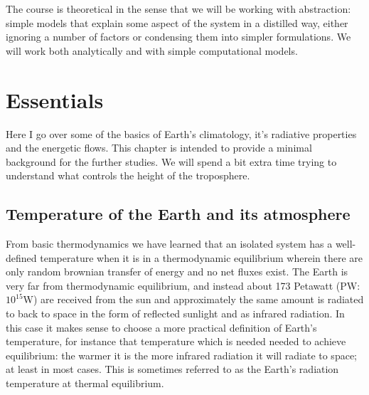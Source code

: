 \documentclass[12pt]{book}
\begin{document}
The course is theoretical in the sense that we will be working with abstraction: simple models that explain some aspect of the system in a distilled way, either ignoring a number of factors or condensing them into simpler formulations. We will work both analytically and with simple computational models. 



\mainmatter
\chapter{Essentials}
\label{chapter:essentials}
Here I go over some of the basics of Earth's climatology, it's radiative properties and the energetic flows. This chapter is intended to provide a minimal background for the further studies. We will spend a bit extra time trying to understand what controls the height of the troposphere. 

\section{Temperature of the Earth and its atmosphere}
From basic thermodynamics we have learned that an isolated system has a well-defined temperature when it is in a thermodynamic equilibrium wherein there are only random brownian transfer of energy and no net fluxes exist. The Earth is very far from thermodynamic equilibrium, and instead about 173 Petawatt (PW: $10^{15}$W) are received from the sun and approximately the same amount is radiated to back to space in the form of reflected sunlight and as infrared radiation. In this case it makes sense to choose a more practical definition of Earth's temperature, for instance that temperature which is needed  needed to achieve equilibrium: the warmer it is the more infrared radiation it will radiate to space; at least in most cases. This is sometimes referred to as the Earth's radiation temperature at thermal equilibrium.
\end{document}
